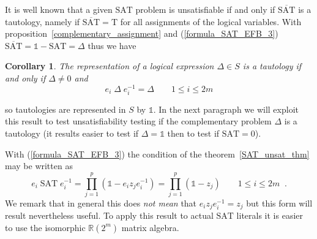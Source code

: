 \documentclass[a4paper,twoside,11pt]{article}
\newtheorem{MS_Corollary}[MS_Proposition]{Corollary}
\begin{document}
It is well known that a given {\ensuremath{\mbox{SAT}}}{} problem is unsatisfiable if and only if ${\overline{\ensuremath{\mbox{SAT}}}}$ is a tautology, namely if ${\overline{\ensuremath{\mbox{SAT}}}} = \mathrm{T}$ for all assignments of the logical variables. With proposition~\ref{complementary_assignment} and (\ref{formula_SAT_EFB_3}) ${\overline{\ensuremath{\mbox{SAT}}}} = {\ensuremath{\mathbb{1}}} - {\ensuremath{\mbox{SAT}}} = \Delta$ thus we have
\begin{MS_Corollary}
\label{TAUT_in_Cl}
The representation of a logical expression $\Delta \in S$ is a tautology if and only if $\Delta \ne 0$ and
$$
{e}_i \; \Delta \; {e}_i^{-1} = \Delta \qquad 1 \le i \le 2 m
$$
\end{MS_Corollary}
\noindent so tautologies are represented in $S$ by ${\ensuremath{\mathbb{1}}}$. In the next paragraph we will exploit this result to test unsatisfiability testing if the complementary problem $\Delta$ is a tautology (it results easier to test if $\Delta = {\ensuremath{\mathbb{1}}}$ then to test if ${\ensuremath{\mbox{SAT}}} = 0$).

With (\ref{formula_SAT_EFB_3}) the condition of the theorem~\ref{SAT_unsat_thm} may be written as
\begin{equation}
\label{formula_invariance_condition_2}
{e}_i \; {\ensuremath{\mbox{SAT}}} \; {e}_i^{-1} = \prod_{j = 1}^p ({\ensuremath{\mathbb{1}}} - {e}_i z_j {e}_i^{-1}) = \prod_{j = 1}^p ({\ensuremath{\mathbb{1}}} - z_j) \qquad 1 \le i \le 2 m {\;\; \mathrm{.}}
\end{equation}
\noindent We remark that in general this does \emph{not mean} that ${e}_i z_j {e}_i^{-1} = z_j$ but this form will result nevertheless useful. To apply this result to actual {\ensuremath{\mbox{SAT}}}{} literals it is easier to use the isomorphic ${\ensuremath{\mathbb{R}}}(2^m)$ matrix algebra.
\end{document}
